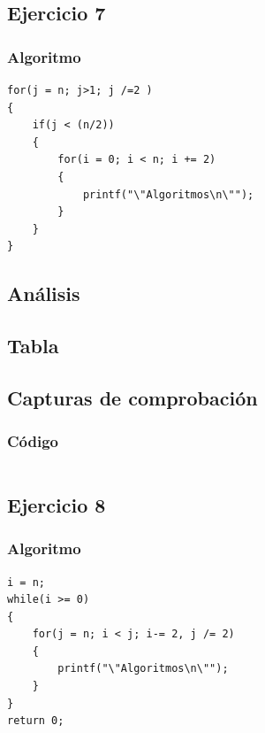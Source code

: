 \documentclass[12pt]{article}
\begin{document}
	    \subsection{Ejercicio 7}

			\subsubsection{Algoritmo}	    
    			\begin{lstlisting}[style=Java]
for(j = n; j>1; j /=2 )
{
	if(j < (n/2))
	{
		for(i = 0; i < n; i += 2)
		{
			printf("\"Algoritmos\n\"");
		}
	}
}
    		    \end{lstlisting}

    		\subsection{Análisis}

    		\subsection{Tabla}
	        
	        \subsection{Capturas de comprobación}

	        \subsubsection{Código}
	            \begin{lstlisting}[style=Java]
    		    \end{lstlisting}


	    \subsection{Ejercicio 8}

			\subsubsection{Algoritmo}	    
    			\begin{lstlisting}[style=Java]
i = n;
while(i >= 0)
{
	for(j = n; i < j; i-= 2, j /= 2)
	{
		printf("\"Algoritmos\n\"");	
	}
}
return 0;
    		    \end{lstlisting}		
    		
\end{document}
